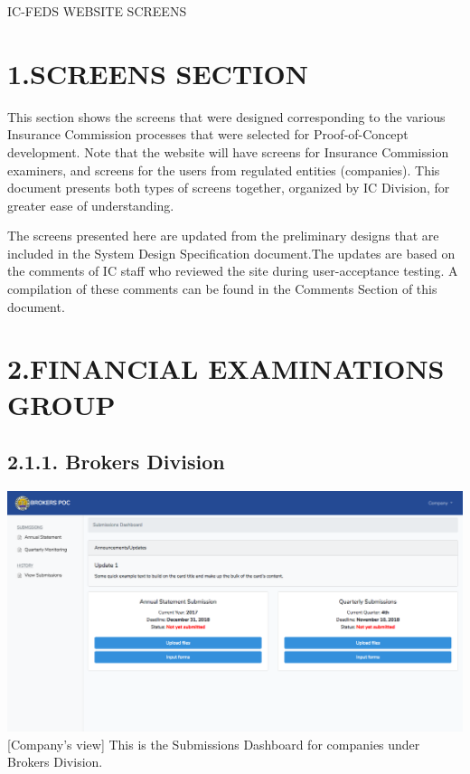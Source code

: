 \documentclass{article}
\begin{document}
\noindent{}IC-FEDS WEBSITE SCREENS%

\section{1.\hspace*{0.5em}SCREENS SECTION}\label{sec-screens-section}%

\noindent{}This section shows the screens that were designed
corresponding to the various Insurance Commission processes that were
selected for Proof-of-Concept development. Note that the website will
have screens for Insurance Commission examiners, and screens for the
users from regulated entities (companies). This document presents both
types of screens together, organized by IC Division, for greater ease of
understanding.%

The screens presented here are updated from the preliminary
designs that are included in the System Design Specification
document.The updates are based on the comments of IC staff who reviewed
the site during user-acceptance testing. A compilation of these comments
can be found in the Comments Section of this document.%

\section{2.\hspace*{0.5em}FINANCIAL EXAMINATIONS GROUP}\label{sec-financial-examinations-group}%

\subsection{2.1.\hspace*{0.5em}1.  Brokers Division}\label{sec-1-brokers-division}%

\noindent{}\includegraphics[keepaspectratio=true]{up-ic-screens/image141}{}[Company’s view] This is the Submissions Dashboard for
companies under Brokers Division.%
\end{document}
